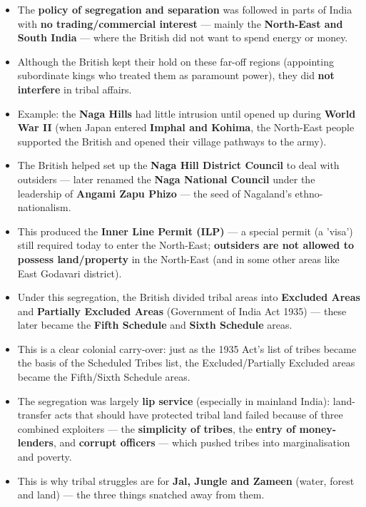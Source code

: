 \begin{KeyConcept}
\begin{itemize}
\item The \textbf{policy of segregation and separation} was followed in parts of India with \textbf{no trading/commercial interest} --- mainly the \textbf{North-East and South India} --- where the British did not want to spend energy or money.
\item Although the British kept their hold on these far-off regions (appointing subordinate kings who treated them as paramount power), they did \textbf{not interfere} in tribal affairs.
\item Example: the \textbf{Naga Hills} had little intrusion until opened up during \textbf{World War II} (when Japan entered \textbf{Imphal and Kohima}, the North-East people supported the British and opened their village pathways to the army).
\item The British helped set up the \textbf{Naga Hill District Council} to deal with outsiders --- later renamed the \textbf{Naga National Council} under the leadership of \textbf{Angami Zapu Phizo} --- the seed of Nagaland's ethno-nationalism.
\item This produced the \textbf{Inner Line Permit (ILP)} --- a special permit (a 'visa') still required today to enter the North-East; \textbf{outsiders are not allowed to possess land/property} in the North-East (and in some other areas like East Godavari district).
\end{itemize}
\end{KeyConcept}

\begin{ComparisonBox}
\begin{itemize}
\item Under this segregation, the British divided tribal areas into \textbf{Excluded Areas} and \textbf{Partially Excluded Areas} (Government of India Act 1935) --- these later became the \textbf{Fifth Schedule} and \textbf{Sixth Schedule} areas.
\item This is a clear colonial carry-over: just as the 1935 Act's list of tribes became the basis of the Scheduled Tribes list, the Excluded/Partially Excluded areas became the Fifth/Sixth Schedule areas.
\end{itemize}
\end{ComparisonBox}

\begin{CriticalPoint}
\begin{itemize}
\item The segregation was largely \textbf{lip service} (especially in mainland India): land-transfer acts that should have protected tribal land failed because of three combined exploiters --- the \textbf{simplicity of tribes}, the \textbf{entry of money-lenders}, and \textbf{corrupt officers} --- which pushed tribes into marginalisation and poverty.
\item This is why tribal struggles are for \textbf{Jal, Jungle and Zameen} (water, forest and land) --- the three things snatched away from them.
\end{itemize}
\end{CriticalPoint}

